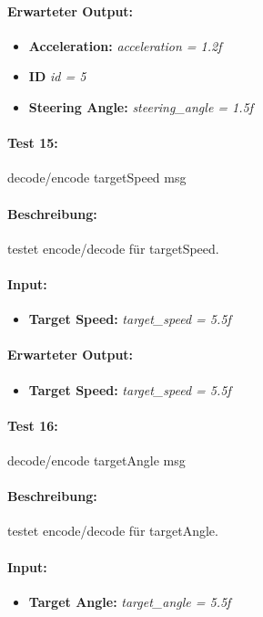 \documentclass[a4paper, 12pt, titlepage]{scrartcl}
\begin{document}
{			\paragraph{Erwarteter Output:}
			\begin{itemize} \itemsep-0.5em
				\item \textbf{Acceleration:} \emph{acceleration = 1.2f}
				\item \textbf{ID} \emph{id = 5}
				\item \textbf{Steering Angle:} \emph{steering\_angle = 1.5f}
			\end{itemize}
			
			\paragraph{Test 15:}{decode/encode targetSpeed msg}
			\paragraph{Beschreibung:} testet encode/decode für targetSpeed.
			\paragraph{Input:}
			\begin{itemize} \itemsep-0.5em
				\item \textbf{Target Speed:} \emph{target\_speed = 5.5f}
			\end{itemize}
			\paragraph{Erwarteter Output:}
			\begin{itemize} \itemsep-0.5em
				\item \textbf{Target Speed:} \emph{target\_speed = 5.5f}
			\end{itemize}
			
			\paragraph{Test 16:}{decode/encode targetAngle msg}
			\paragraph{Beschreibung:} testet encode/decode für targetAngle.
			\paragraph{Input:}
			\begin{itemize} \itemsep-0.5em
				\item \textbf{Target Angle:} \emph{target\_angle = 5.5f}
			\end{itemize}
}
\end{document}
